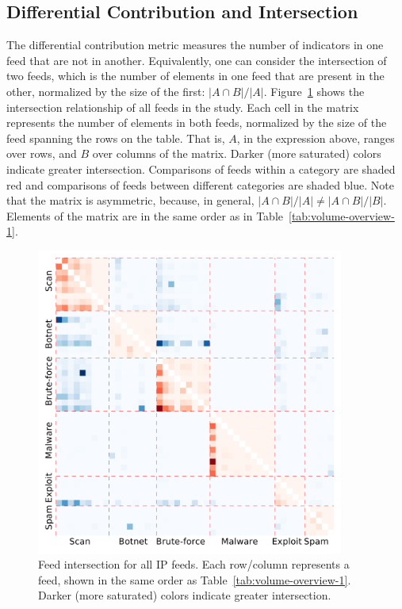 \subsection{Differential Contribution and Intersection}
\label{sec:ip-overlap}

The differential contribution metric measures the number of indicators in one feed that are not in another. Equivalently, one can consider the intersection of two feeds, which is the number of elements in one feed that are present in the other, normalized by the size of the first: $|A\cap B|/|A|$. Figure~\ref{fig:overall_heatmap} shows the intersection relationship of all feeds in the study. Each cell in the matrix represents the number of elements in both feeds, normalized by the size of the feed spanning the rows on the table. That is, $A$, in the expression above, ranges over rows, and $B$ over columns of the matrix. Darker (more saturated) colors indicate greater intersection. Comparisons of feeds within a category are shaded red and comparisons of feeds between different categories are shaded blue. Note that the matrix is asymmetric, because, in general, $|A\cap B|/|A| \neq |A\cap B|/|B|$. Elements of the matrix are in the same order as in Table~\ref{tab:volume-overview-1}.

\begin{figure}
\centering
\includegraphics[width=0.9\textwidth]{data_character/images/overall_heatmap.pdf}
\caption{Feed intersection for all IP feeds. Each row/column represents a feed, shown in the same order as Table~\ref{tab:volume-overview-1}. Darker (more saturated) colors indicate greater intersection.}
\label{fig:overall_heatmap}
\end{figure}

